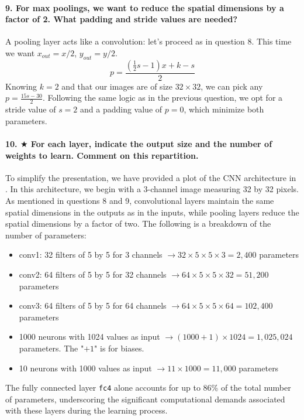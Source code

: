 \paragraph{9. For max poolings, we want to reduce the spatial dimensions by a factor of 2. What padding and stride values are needed?}
A pooling layer acts like a convolution: let's proceed as in question 8. This time we want $ x_{out} = x/2$, $ y_{out} = y/2 $.
\[
    p = \frac{(\frac{1}{2}s - 1) x + k - s}{2}
\]
Knowing $k = 2$ and that our images are of size $32 \times 32 $, we can pick any $p = \frac{15s - 30}{2}$. Following the same logic as in the previous question, we opt for a stride value of $ s = 2 $ and a padding value of $ p = 0 $, which minimize both parameters.

\paragraph{10. $ \bigstar $ For each layer, indicate the output size and the number of weights to learn. Comment on this repartition.}
To simplify the presentation, we have provided a plot of the CNN architecture in . In this architecture, we begin with a 3-channel image measuring 32 by 32 pixels. As mentioned in questions 8 and 9, convolutional layers maintain the same spatial dimensions in the outputs as in the inputs, while pooling layers reduce the spatial dimensions by a factor of two. The following is a breakdown of the number of parameters:
\begin{itemize}
    \item conv1: 32 filters of 5 by 5 for 3 channels $\rightarrow 32\times 5\times 5\times 3 = 2,400$ parameters
    \item conv2: 64 filters of 5 by 5 for 32 channels $\rightarrow 64\times 5\times 5\times 32 = 51,200$ parameters
    \item conv3: 64 filters of 5 by 5 for 64 channels $\rightarrow 64\times 5\times 5\times 64 = 102,400$ parameters
    \item 1000 neurons with 1024 values as input $\rightarrow (1000 + 1)\times 1024=1,025,024$ parameters. The "$+1$" is for biases.
    \item 10 neurons with 1000 values as input $\rightarrow 11\times 1000=11,000$ parameters
\end{itemize}

The fully connected layer \texttt{fc4} alone accounts for up to 86\% of the total number of parameters, underscoring the significant computational demands associated with these layers during the learning process.

